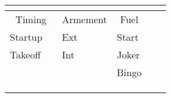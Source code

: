 {\begin{tabularx}{\linewidth}{@{} *{8}X @{}}
\multicolumn{1}{l|}{}    & \multicolumn{1}{l|}{}     & \multicolumn{1}{l|}{}    & \multicolumn{1}{l|}{}    & \multicolumn{1}{l|}{}    & \multicolumn{1}{l|}{}    & \multicolumn{1}{l|}{}     &                          \\ \midrule
\multicolumn{2}{c|}{Timing}                          & \multicolumn{2}{c|}{Armement}                       & \multicolumn{2}{c|}{Fuel}                           &                           &                          \\ \cmidrule(r){1-6}
Startup                  & \multicolumn{1}{l|}{}     & \multicolumn{2}{l|}{Ext}                            & \multicolumn{2}{l|}{Start}                          &                           &                          \\
Takeoff                  & \multicolumn{1}{l|}{}     & \multicolumn{2}{l|}{Int}                            & \multicolumn{2}{l|}{Joker}                          &                           &                          \\ \cmidrule(r){1-4}
                         & \multicolumn{1}{l|}{}     &                          & \multicolumn{1}{l|}{}    & \multicolumn{2}{l|}{Bingo}                          &                           &                          \\ \cmidrule(r){1-2} \cmidrule(lr){5-6}
                         & \multicolumn{1}{l|}{}     &                          &                          &                          &                          &                           &                          \\ \cmidrule(r){1-2}
                         & \multicolumn{1}{l|}{}     &                          &                          &                          &                          &                           &                          \\ \cmidrule(r){1-2}
                         &                           &                          &                          &                          &                          &                           &                         
\end{tabularx}
}


